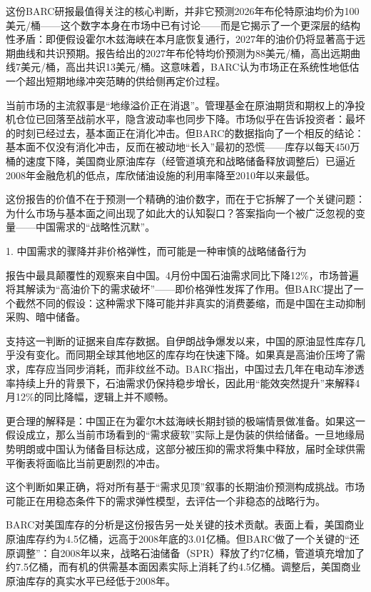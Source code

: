 \documentclass[11pt]{ctexart}
\begin{document}
这份BARC研报最值得关注的核心判断，并非它预测2026年布伦特原油均价为100美元/桶——这个数字本身在市场中已有讨论——而是它揭示了一个更深层的结构性矛盾：即便假设霍尔木兹海峡在本月底恢复通行，2027年的油价仍将显著高于远期曲线和共识预期。报告给出的2027年布伦特均价预测为88美元/桶，高出远期曲线7美元/桶，高出共识13美元/桶。这意味着，BARC认为市场正在系统性地低估一个超出短期地缘冲突范畴的供给侧再定价过程。

当前市场的主流叙事是“地缘溢价正在消退”。管理基金在原油期货和期权上的净投机仓位已回落至战前水平，隐含波动率也同步下降。市场似乎在告诉投资者：最坏的时刻已经过去，基本面正在消化冲击。但BARC的数据指向了一个相反的结论：基本面不仅没有消化冲击，反而在被动地“长入”最初的恐慌——库存以每天450万桶的速度下降，美国商业原油库存（经管道填充和战略储备释放调整后）已逼近2008年金融危机的低点，库欣储油设施的利用率降至2010年以来最低。

这份报告的价值不在于预测一个精确的油价数字，而在于它拆解了一个关键问题：为什么市场与基本面之间出现了如此大的认知裂口？答案指向一个被广泛忽视的变量——中国需求的“战略性沉默”。

1. 中国需求的骤降并非价格弹性，而可能是一种审慎的战略储备行为

报告中最具颠覆性的观察来自中国。4月份中国石油需求同比下降12\%，市场普遍将其解读为“高油价下的需求破坏”——即价格弹性发挥了作用。但BARC提出了一个截然不同的假设：这种需求下降可能并非真实的消费萎缩，而是中国在主动抑制采购、暗中储备。

支持这一判断的证据来自库存数据。自伊朗战争爆发以来，中国的原油显性库存几乎没有变化。而同期全球其他地区的库存均在快速下降。如果真是高油价压垮了需求，库存应当同步消耗，而非纹丝不动。BARC指出，中国过去几年在电动车渗透率持续上升的背景下，石油需求仍保持稳步增长，因此用“能效突然提升”来解释4月12\%的同比降幅，逻辑上并不顺畅。

更合理的解释是：中国正在为霍尔木兹海峡长期封锁的极端情景做准备。如果这一假设成立，那么当前市场看到的“需求疲软”实际上是伪装的供给储备。一旦地缘局势明朗或中国认为储备目标达成，这部分被压抑的需求将集中释放，届时全球供需平衡表将面临比当前更剧烈的冲击。

这个判断如果正确，将对所有基于“需求见顶”叙事的长期油价预测构成挑战。市场可能正在用稳态条件下的需求弹性模型，去评估一个非稳态的战略行为。

BARC对美国库存的分析是这份报告另一处关键的技术贡献。表面上看，美国商业原油库存约为4.5亿桶，远高于2008年底的3.01亿桶。但BARC做了一个关键的“还原调整”：自2008年以来，战略石油储备（SPR）释放了约7亿桶，管道填充增加了约7.5亿桶，而有机的供需基本面因素实际上消耗了约4.5亿桶。调整后，美国商业原油库存的真实水平已经低于2008年。
\end{document}
